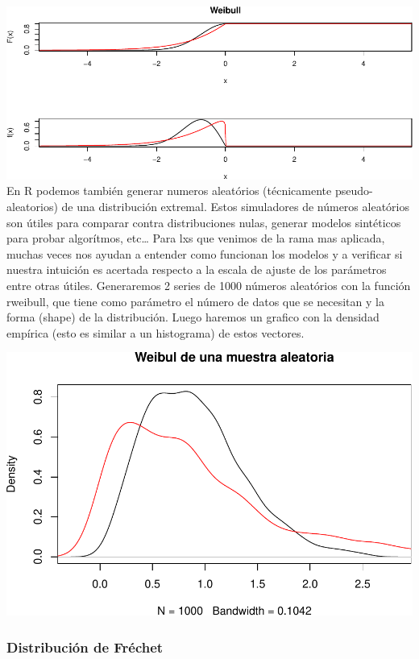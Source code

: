 \documentclass[
]{book}
\theoremstyle{definition}
\theoremstyle{definition}
\theoremstyle{definition}
\theoremstyle{definition}
\theoremstyle{remark}
\begin{document}
\includegraphics{_main_files/figure-latex/unnamed-chunk-23-1.pdf}
En R podemos también generar numeros aleatórios (técnicamente pseudo-aleatorios) de una distribución extremal. Estos simuladores de números aleatórios son útiles para comparar contra distribuciones nulas, generar modelos sintéticos para probar algorítmos, etc\ldots{}
Para lxs que venimos de la rama mas aplicada, muchas veces nos ayudan a entender como funcionan los modelos y a verificar si nuestra intuición es acertada respecto a la escala de ajuste de los parámetros entre otras útiles. Generaremos 2 series de 1000 números aleatórios con la función rweibull, que tiene como parámetro el número de datos que se necesitan y la forma (shape) de la distribución. Luego haremos un grafico con la densidad empírica (esto es similar a un histograma) de estos vectores.

\includegraphics{_main_files/figure-latex/unnamed-chunk-24-1.pdf}

\subsubsection{Distribución de Fréchet}\label{distribuciuxf3n-de-fruxe9chet}
\end{document}
